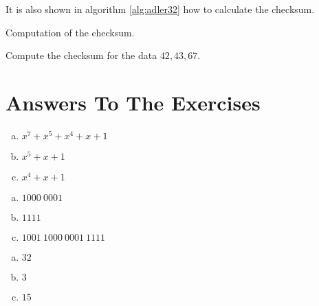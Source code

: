 It is also shown in algorithm \ref{alg:adler32} how to calculate the
\adlerchk checksum.

\begin{algorithm}[H]
  \caption{Computation of the \adlerchk checksum.}
  \label{alg:adler32}
  \begin{algorithmic}[1]

    \EndForEach
    \State {}
    \EndProcedure
  \end{algorithmic}
\end{algorithm}

\begin{Exercise}[label={ex-adler32}]

  Compute the \adlerchk checksum for the data $42,43,67$.

\end{Exercise}

\section{Answers To The Exercises}

\begin{Answer}[ref={bin-to-poly}]
  \begin{enumerate}[(a)]
  \item $x^7 + x^5 + x^4 + x + 1$
  \item $x^5+ x + 1$
  \item $x^4 + x + 1$
  \end{enumerate}
\end{Answer}

\begin{Answer}[ref={poly-to-bin}]
  \begin{enumerate}[(a)]
  \item $1000\ 0001$
  \item $1111$
  \item $1001\ 1000\ 0001\ 1111$
  \end{enumerate}
\end{Answer}

\begin{Answer}[ref={width-poly}]

  \begin{enumerate}[(a)]
  \item $32$
  \item $3$
  \item $15$
  \end{enumerate}

\end{Answer}

